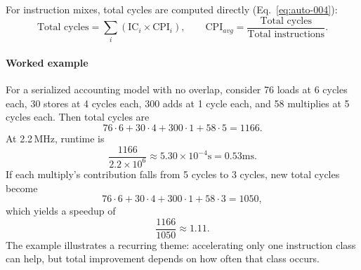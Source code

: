For instruction mixes, total cycles are computed directly (Eq.~\eqref{eq:auto-004}):
\begin{equation}\label{eq:auto-004}
    \text{Total cycles} = \sum_i \left(\text{IC}_i \times \text{CPI}_i\right), \qquad
    \text{CPI}_{avg} = \frac{\text{Total cycles}}{\text{Total instructions}}.
\end{equation}

\paragraph{Worked example}\label{par:auto-009}
For a serialized accounting model with no overlap, consider 76 loads at 6 cycles each, 30 stores at 4 cycles each, 300 adds at 1 cycle each, and 58 multiplies at 5 cycles each.
Then total cycles are
\begin{equation}\label{eq:auto-005}
    76\cdot6 + 30\cdot4 + 300\cdot1 + 58\cdot5 = 1166.
\end{equation}
At 2.2\,MHz, runtime is
\begin{equation}\label{eq:auto-006}
    \frac{1166}{2.2\times 10^6} \approx 5.30\times 10^{-4}\text{s} = 0.53\text{ms}.
\end{equation}
If each multiply's contribution falls from 5 cycles to 3 cycles, new total cycles become
\begin{equation}\label{eq:auto-007}
    76\cdot6 + 30\cdot4 + 300\cdot1 + 58\cdot3 = 1050,
\end{equation}
which yields a speedup of
\begin{equation}\label{eq:auto-008}
    \frac{1166}{1050}\approx 1.11.
\end{equation}
The example illustrates a recurring theme: accelerating only one instruction class can help, but total improvement depends on how often that class occurs.

